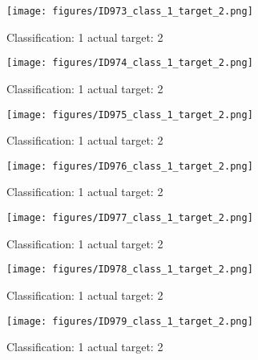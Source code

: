 \begin{figure}[h!]
\begin{center}
\texttt{[image: figures/ID973\_class\_1\_target\_2.png]}
\end{center}
\caption{ Classification: 1 actual target: 2}
\label{fig:ID973_class_1_target_2}
\end{figure}
\begin{figure}[h!]
\begin{center}
\texttt{[image: figures/ID974\_class\_1\_target\_2.png]}
\end{center}
\caption{ Classification: 1 actual target: 2}
\label{fig:ID974_class_1_target_2}
\end{figure}
\begin{figure}[h!]
\begin{center}
\texttt{[image: figures/ID975\_class\_1\_target\_2.png]}
\end{center}
\caption{ Classification: 1 actual target: 2}
\label{fig:ID975_class_1_target_2}
\end{figure}
\begin{figure}[h!]
\begin{center}
\texttt{[image: figures/ID976\_class\_1\_target\_2.png]}
\end{center}
\caption{ Classification: 1 actual target: 2}
\label{fig:ID976_class_1_target_2}
\end{figure}
\begin{figure}[h!]
\begin{center}
\texttt{[image: figures/ID977\_class\_1\_target\_2.png]}
\end{center}
\caption{ Classification: 1 actual target: 2}
\label{fig:ID977_class_1_target_2}
\end{figure}
\begin{figure}[h!]
\begin{center}
\texttt{[image: figures/ID978\_class\_1\_target\_2.png]}
\end{center}
\caption{ Classification: 1 actual target: 2}
\label{fig:ID978_class_1_target_2}
\end{figure}
\begin{figure}[h!]
\begin{center}
\texttt{[image: figures/ID979\_class\_1\_target\_2.png]}
\end{center}
\caption{ Classification: 1 actual target: 2}
\label{fig:ID979_class_1_target_2}
\end{figure}
